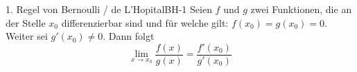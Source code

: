

 \begin{satz}
    {1. Regel von Bernoulli / de L'Hopital}{BH-1}
Seien $f$ und $g$ zwei Funktionen, die an der Stelle $x_0$ differenzierbar sind und für welche gilt: $f(x_0) = g(x_0) = 0$. Weiter sei $g'(x_0) \neq 0$. Dann folgt
\[
\lim_{{x \to x_0}} \frac{f(x)}{g(x)} = \frac{f'(x_0)}{g'(x_0)}
\]
 \end{satz}


